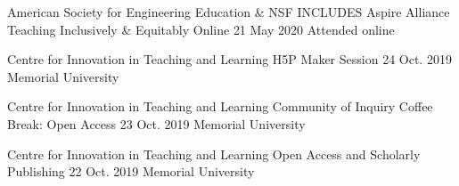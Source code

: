 \begin{cventries}
  \cventry
    {American Society for Engineering Education \& NSF INCLUDES Aspire Alliance} %
    {Teaching Inclusively \& Equitably Online} %
    {21 May 2020} %
    {Attended online} %
    {
    }

  \cventry
    {Centre for Innovation in Teaching and Learning} %
    {H5P Maker Session} %
    {24 Oct. 2019} %
    {Memorial University} %
    {
    }

  \cventry
    {Centre for Innovation in Teaching and Learning} %
    {Community of Inquiry Coffee Break: Open Access} %
    {23 Oct. 2019} %
    {Memorial University} %
    {
    }

  \cventry
    {Centre for Innovation in Teaching and Learning} %
    {Open Access and Scholarly Publishing} %
    {22 Oct. 2019} %
    {Memorial University} %
    {
    }


\end{cventries}
